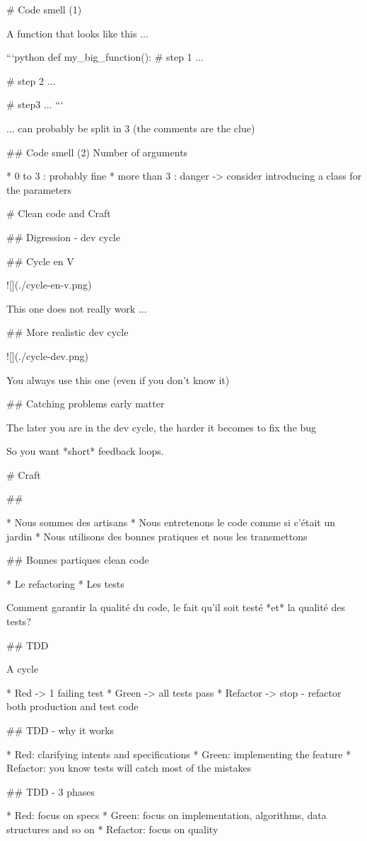# Code smell (1)

A function that looks like this ...

```python
def my_big_function():
    # step 1
    ...

    # step 2
    ...

    # step3
    ...
```

... can probably be split in 3 (the comments are the clue)

## Code smell (2)  Number of arguments

* 0 to 3 : probably fine
* more than 3 : danger -> consider introducing
  a class for the parameters

# Clean code and Craft

## Digression - dev cycle

## Cycle en V

![](./cycle-en-v.png)

This one does not really work ...

## More realistic dev cycle

![](./cycle-dev.png)

You always use this one (even if you don't know it)

## Catching problems early matter

The later you are in the dev cycle, the harder
it becomes to fix the bug

So you want *short* feedback loops.

# Craft

##

* Nous sommes des artisans
* Nous entretenons le code comme si c'était un jardin
* Nous utilisons des bonnes pratiques et nous les transmettons

## Bonnes partiques clean code

* Le refactoring
* Les tests

Comment garantir la qualité du code, le fait qu'il soit testé *et* la qualité des tests?

## TDD

A cycle

* Red -> 1 failing test
* Green -> all tests pass
* Refactor -> stop - refactor both production and test code

## TDD - why it works

* Red: clarifying intents and specifications
* Green: implementing the feature
* Refactor: you know tests will catch most of the mistakes

## TDD - 3 phases

* Red: focus on specs
* Green: focus on implementation, algorithms, data structures and so on
* Refactor: focus on quality

